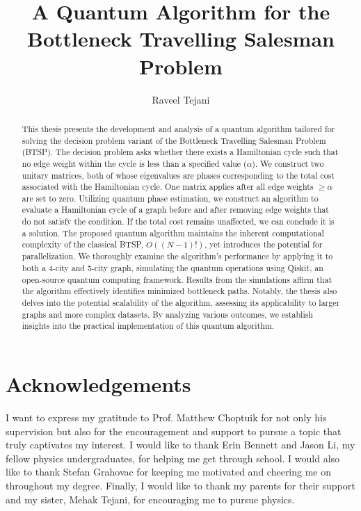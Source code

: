 \documentclass[msc,oneside]{ubcthesis}
\title{A Quantum Algorithm for the Bottleneck Travelling Salesman Problem}
\author{Raveel Tejani}
\begin{document}
	
	
	\frontmatter

	\maketitle               
	

	\clearpage
	\begin{abstract}
		
		This thesis presents the development and analysis of a quantum algorithm tailored for solving the decision problem variant of the Bottleneck Travelling Salesman Problem (BTSP). The decision problem asks whether there exists a Hamiltonian cycle such that no edge weight within the cycle is less than a specified value ($\alpha$). We construct two unitary matrices, both of whose eigenvalues are phases corresponding to the total cost associated with the Hamiltonian cycle. One matrix applies after all edge weights $\geq \alpha$ are set to zero. Utilizing quantum phase estimation, we construct an algorithm to evaluate a Hamiltonian cycle of a graph before and after removing edge weights that do not satisfy the condition. If the total cost remains unaffected, we can conclude it is a solution. The proposed quantum algorithm maintains the inherent computational complexity of the classical BTSP, $O((N-1)!)$, yet introduces the potential for parallelization. We thoroughly examine the algorithm's performance by applying it to both a 4-city and 5-city graph, simulating the quantum operations using Qiskit, an open-source quantum computing framework. Results from the simulations affirm that the algorithm effectively identifies minimized bottleneck paths. Notably, the thesis also delves into the potential scalability of the algorithm, assessing its applicability to larger graphs and more complex datasets. By analyzing various outcomes, we establish insights into the practical implementation of this quantum algorithm.
		
		
	\end{abstract}
	
	
	\tableofcontents 
	\listoftables             
	\listoffigures           

	
	\chapter{Acknowledgements} 
	
	
I want to express my gratitude to Prof. Matthew Choptuik for not only his supervision but also for the encouragement and support to pursue a topic that truly captivates my interest. I would like to thank Erin Bennett and Jason Li, my fellow physics undergraduates, for helping me get through school. I would also like to thank Stefan Grahovac for keeping me motivated and cheering me on throughout my degree. Finally, I would like to thank my parents for their support and my sister, Mehak Tejani, for encouraging me to pursue physics.
	
\end{document}
